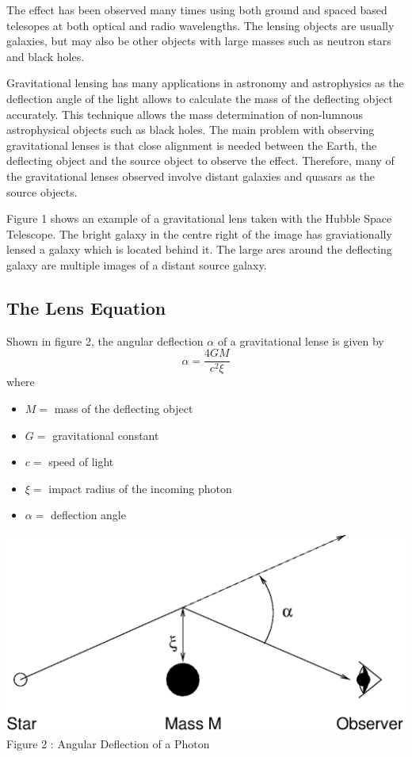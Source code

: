 \documentclass[a4paper]{IEEEtran}
\begin{document}
The effect has been observed many times using both ground and spaced
based telesopes at both optical and radio wavelengths. The lensing objects
are usually galaxies, but may also be other objects with large masses
such as neutron stars and black holes. 

Gravitational lensing has many applications in astronomy and astrophysics
as the deflection angle of the light allows to calculate the mass
of the deflecting object accurately. This technique allows the mass determination
of non-lumnous astrophysical objects such as black holes.
The main problem with observing gravitational lenses is that close
alignment is needed between the Earth, the deflecting object and 
the source object to observe the effect. Therefore, many of the gravitational
lenses observed involve distant galaxies and quasars as the source objects.

Figure 1 shows an example of a gravitational lens taken with the 
Hubble Space Telescope. The bright galaxy in the centre right of the image
has graviationally lensed a galaxy which is located behind it. 
The large arcs around the deflecting galaxy are multiple images of 
a distant source galaxy.

\subsection{The Lens Equation}
Shown in figure 2, the angular deflection $\alpha$ of a 
gravitational lense is given by
\begin{equation}    
    \alpha = \frac{4GM}{c^2 \xi}
\end{equation}
where
\begin{itemize}
    \item $M = $ mass of the deflecting object
    \item $G = $ gravitational constant
    \item $c = $ speed of light
    \item $\xi = $ impact radius of the incoming photon
    \item $\alpha = $ deflection angle
\end{itemize}
\begin{center}
    \includegraphics[width=\columnwidth]{images/gldiag.eps}
    \\[1mm]
    Figure 2 : Angular Deflection of a Photon
\end{center}
\end{document}
